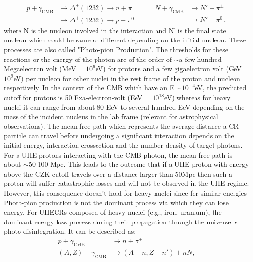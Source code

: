 \begin{equation}\label{eq:GZK}
  \begin{split}
    p + \gamma_{\text{CMB}} &\longrightarrow \Delta^+(1232 ) \longrightarrow n+\pi^+ \\ 
                     &\longrightarrow \Delta^+(1232 ) \longrightarrow p+\pi^0
  \end{split} 
  \qquad
  \begin{split}
    N + \gamma_{\text{CMB}} &\longrightarrow N' + \pi^{\pm} \\ 
                     &\longrightarrow N' + \pi^0 \, , 
  \end{split} 
\end{equation}
where N is the nucleon involved in the interaction and N' is the final state nucleon which could be same or different depending on the initial nucleon. These processes are also called "Photo-pion Production". The thresholds for these reactions or the energy of the photon are of the order of $\sim$a few hundred Megaelectron volt (MeV = $10^6$eV) for protons and a few gigaelectron volt (GeV = $10^9$eV) per nucleon for other nuclei in the rest frame of the proton and nucleon respectively. In the context of the CMB which have an E $\sim 10^{-4}$eV, the predicted cutoff for protons is 50 Exa-electron-volt (EeV = $10^{18}$eV) whereas for heavy nuclei it can range from about 80 EeV to several hundred EeV depending on the mass of the incident nucleus in the lab frame (relevant for astrophysical observations). The mean free path which represents the average distance a \gls{CR} particle can travel before undergoing a significant interaction depends on the initial energy, interaction crossection and the number density of target photons. For a UHE protons interacting with the CMB photon, the mean free path is about $\sim$50-100 Mpc. This leads to the outcome that if a \gls{UHE} proton with energy above the GZK cutoff travels over a distance larger than 50Mpc then such a proton will suffer catastrophic losses and will not be observed in the UHE regime. However, this consequence doesn't hold for heavy nuclei since for similar energies Photo-pion production is not the dominant process via which they can lose energy. For \glspl{UHECR} composed of heavy nuclei (e.g., iron, uranium), the dominant energy loss process during their propagation through the universe is photo-disintegration. It can be described as:
\begin{equation}\label{eq:Pdisinteg}
  \begin{aligned}
    p + \gamma_{\text{CMB}} &\longrightarrow n + \pi^+ \\
    (A,Z) + \gamma_{\text{CMB}} &\longrightarrow (A-n, Z- n') + nN ,  
  \end{aligned} 
\end{equation}
